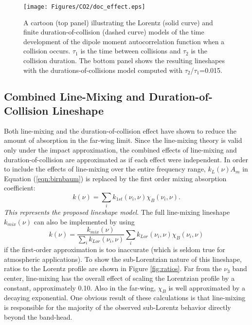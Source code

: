 \documentclass[11pt]{article}
\begin{document}
\begin{figure}[h]
\begin{center}\texttt{[image: Figures/CO2/doc\_effect.eps]}
\end{center}
  \caption[Illustration of the Lorentz and
        finite duration-of-collision models of the time
        development of the dipole moment autocorrelation function
        and the resulting lineshapes.] 
        {A cartoon (top panel) illustrating the Lorentz (solid curve) and
        finite duration-of-collision (dashed curve) models of the time
        development of the dipole moment autocorrelation function when a 
        collision occurs.  $\tau_1$ is the time between collisions and
        $\tau_2$ is the collision duration.  The bottom panel shows the 
        resulting lineshapes with the durations-of-collisions model 
        computed with $\tau_2$/$\tau_1$=0.015.}
  \label{fig:doc_effect}
\end{figure}

\subsection{Combined Line-Mixing and Duration-of-Collision Lineshape}
\label{sec:combined}
Both line-mixing and the duration-of-collision effect have shown to reduce
the amount of absorption in the far-wing limit.  Since the line-mixing
theory is valid only under the impact approximation, the combined effects
of line-mixing and duration-of-collision are approximated as if each
effect were independent.  In order to include the effects of line-mixing
over the entire frequency range, $k_{L}(\nu) A_{m}$ in 
Equation (\ref{eqn:birnbaum}) is replaced by the first order mixing 
absorption coefficient:
\begin{equation}
k(\nu)=\sum_i k_{1st}(\nu_i,\nu)\chi_{B}(\nu_i,\nu).
\label{eqn:proposed}
\end{equation}
{\em This represents the proposed lineshape model}.  The full line-mixing 
lineshape $k_{mix}(\nu)$ can also be implemented by using 
\[
k(\nu)=\frac{k_{mix}(\nu)}{\sum_i k_{Lor}(\nu_i,\nu)}
\sum_i k_{Lor}(\nu_i,\nu)\chi_B(\nu_i,\nu)
\]
if the first-order approximation is too inaccurate (which is seldom true 
for atmospheric applications).
To show the sub-Lorentzian nature of this lineshape, ratios to the Lorentz 
profile are shown in Figure \ref{fig:ratios}.  Far from the $\nu_3$ band 
center, line-mixing has the overall effect of scaling the Lorentzian 
profile by a constant, approximately 0.10.  Also in the far-wing, $\chi_B$
is well approximated by a decaying exponential.  One obvious result of
these calculations is that line-mixing is responsible for the majority of
the observed sub-Lorentz behavior directly beyond the band-head.
\end{document}
